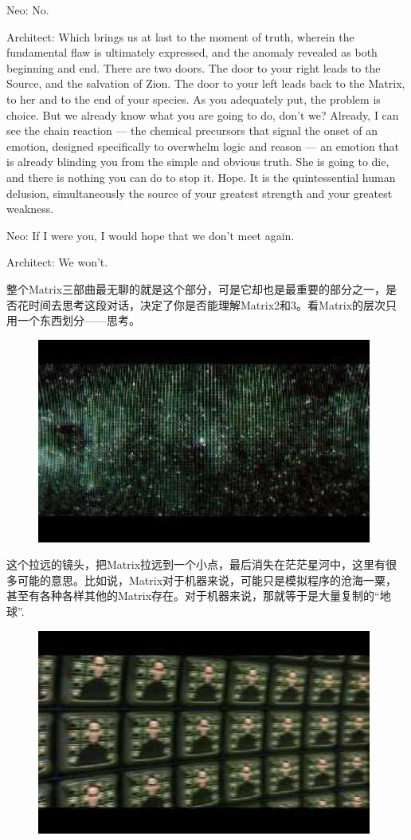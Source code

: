 \documentclass{ctexart}
\newenvironment{myquote}{\color{green} \setlength{\leftskip}{6em} \setlength{\rightskip}{4em} \setlength{\parindent}{-2em}}{\par}
\begin{document}
\begin{myquote}
Neo: No.

Architect: Which brings us at last to the moment of truth, wherein the fundamental flaw is ultimately expressed, and the anomaly revealed as both beginning and end. There are two doors. The door to your right leads to the Source, and the salvation of Zion. The door to your left leads back to the Matrix, to her and to the end of your species. As you adequately put, the problem is choice. But we already know what you are going to do, don't we? Already, I can see the chain reaction --- the chemical precursors that signal the onset of an emotion, designed specifically to overwhelm logic and reason --- an emotion that is already blinding you from the simple and obvious truth. She is going to die, and there is nothing you can do to stop it. Hope. It is the quintessential human delusion, simultaneously the source of your greatest strength and your greatest weakness.

Neo: If I were you, I would hope that we don't meet again.

Architect: We won't.
\end{myquote}

整个Matrix三部曲最无聊的就是这个部分，可是它却也是最重要的部分之一，是否花时间去思考这段对话，决定了你是否能理解Matrix2和3。看Matrix的层次只用一个东西划分——思考。

\begin{figure}[htb]
\centering
\includegraphics[width=0.5\linewidth]{fig/read_reloaded-156}
\end{figure}

这个拉远的镜头，把Matrix拉远到一个小点，最后消失在茫茫星河中，这里有很多可能的意思。比如说，Matrix对于机器来说，可能只是模拟程序的沧海一粟，甚至有各种各样其他的Matrix存在。对于机器来说，那就等于是大量复制的“地球”.

\begin{figure}[htb]
\centering
\includegraphics[width=0.5\linewidth]{fig/read_reloaded-157}
\end{figure}
\end{document}
